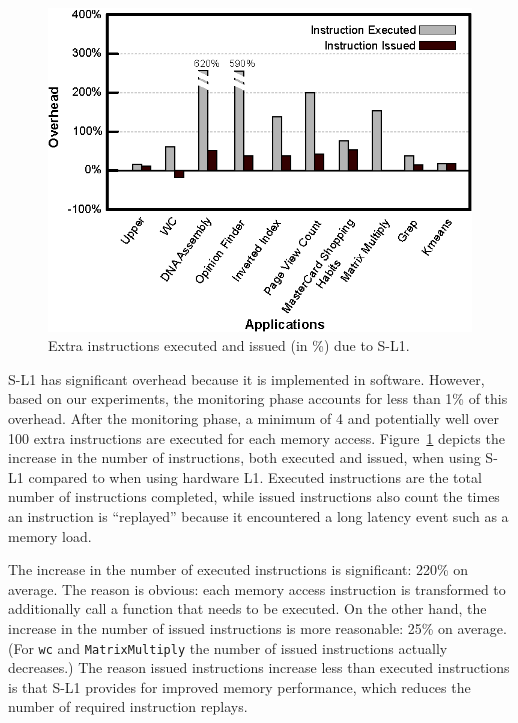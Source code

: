 \begin{figure}[t]
\center
\includegraphics[scale=0.93]{4instructionIssueOverhead.eps}
\vspace{-0.4cm}
\caption{\footnotesize\textnormal{Extra instructions executed and issued (in \%) due to S-L1.}}
\label{fig:instexecissuedoverhead}
\end{figure}

S-L1 has significant overhead because it is implemented in software. 
However, based on our experiments, the monitoring phase accounts for less than 1\% of this overhead.
After the monitoring phase, a minimum of 4 and potentially well over 100 extra
instructions are executed for each memory access.
Figure~\ref{fig:instexecissuedoverhead} depicts the increase in the number of instructions, both executed and issued,
when using S-L1 compared to when using hardware L1.
Executed instructions are the total number of instructions completed, while 
issued instructions also count the times an instruction is ``replayed'' because it
encountered a long latency event such as a memory load.

The increase in the number of executed instructions is significant: 220\% on average. 
The reason is obvious: each memory access instruction is transformed to additionally call a function that needs to be executed. 
On the other hand, the increase in the number of issued instructions is more reasonable: 25\% on average. 
(For \texttt{wc} and \texttt{MatrixMultiply} the number of issued instructions actually decreases.)
The reason issued instructions increase less than executed instructions is that S-L1 provides for improved memory performance, which reduces the number of required 
instruction replays.



